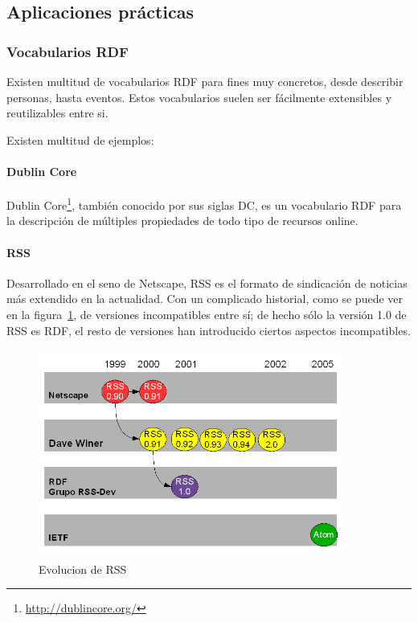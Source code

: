 \subsection{Aplicaciones prácticas}

\subsubsection{Vocabularios RDF}

Existen multitud de vocabularios RDF para fines muy concretos, desde describir
personas, hasta eventos. Estos vocabularios suelen ser fácilmente extensibles y 
reutilizables entre si.

Existen multitud de ejemplos:

\paragraph{Dublin Core\label{sec:dc}}

Dublin Core\footnote{\url{http://dublincore.org/}}, también conocido por sus siglas DC,
es un vocabulario RDF para la descripción de múltiples propiedades de todo tipo de 
recursos online.

\paragraph{RSS}

Desarrollado en el seno de Netscape, RSS es el formato de sindicación de noticias
más extendido en la actualidad. Con un complicado historial, como se puede ver en la
figura~\ref{fig:rssEvolution}, de versiones incompatibles entre sí; de hecho sólo 
la versión 1.0 de RSS es RDF, el resto de versiones han introducido ciertos aspectos
incompatibles.

\begin{figure}[p]
	\centering
	\includegraphics[width=10cm]{images/rssEvolution.png}
	\caption{Evolucion de RSS}
	\label{fig:rssEvolution}
\end{figure}

